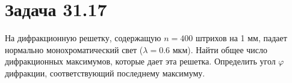\section{Задача 31.17}

На дифракционную решетку, содержащую $n=400$ штрихов на 1 мм, падает нормально монохроматический свет ($\lambda=0.6$ мкм). Найти общее число дифракционных максимумов, которые дает эта решетка. Определить угол $\varphi$ дифракции, соответствующий последнему максимуму.